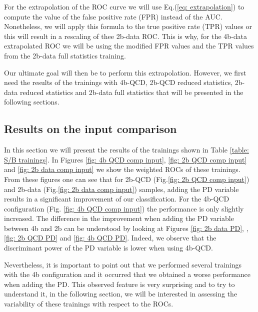 For the extrapolation of the ROC curve we will use Eq.(\ref{eq: extrapolation})  to compute the value of the false positive rate (FPR) instead of the AUC. Nonetheless, we will apply this formula to the true positive rate (TPR) values or this will result in a rescaling of thee 2b-data ROC. This is why, for the 4b-data extrapolated ROC we will be using the modified FPR values and the TPR values from the 2b-data full statistics training. 

Our ultimate goal will then be to perform this extrapolation. However, we first need the results of the trainings with 4b-QCD, 2b-QCD reduced statistics, 2b-data reduced statistics and 2b-data full statistics that will be presented in the following sections.


\subsection{Results on the input comparison} \label{subsection: results on the trainings}


In this section we will present the results of the trainings shown in Table \ref{table: S/B trainings}. In Figures \ref{fig: 4b QCD comp input}, \ref{fig: 2b QCD comp input} and \ref{fig: 2b data comp input} we show the weighted ROCs of these trainings. From these figures one can see that for 2b-QCD (Fig.\ref{fig: 2b QCD comp input}) and 2b-data (Fig.\ref{fig: 2b data comp input}) samples, adding the PD variable results in a significant improvement of our classification. For the 4b-QCD configuration (Fig. \ref{fig: 4b QCD comp input})  the performance is only slightly increased.  The difference in the improvement when adding the PD variable between 4b and 2b can be understood by looking at Figures \ref{fig: 2b data PD}, , \ref{fig: 2b QCD PD} and \ref{fig: 4b QCD PD}. Indeed, we observe that the discriminant power of the PD variable is lower when using 4b-QCD.

Nevertheless, it is important to point out that we performed several trainings with the 4b configuration and it occurred that we obtained a worse performance when adding the PD. This observed feature is very surprising and to try to understand it, in the following section, we will be interested in assessing the variability of these trainings with respect to the ROCs.

